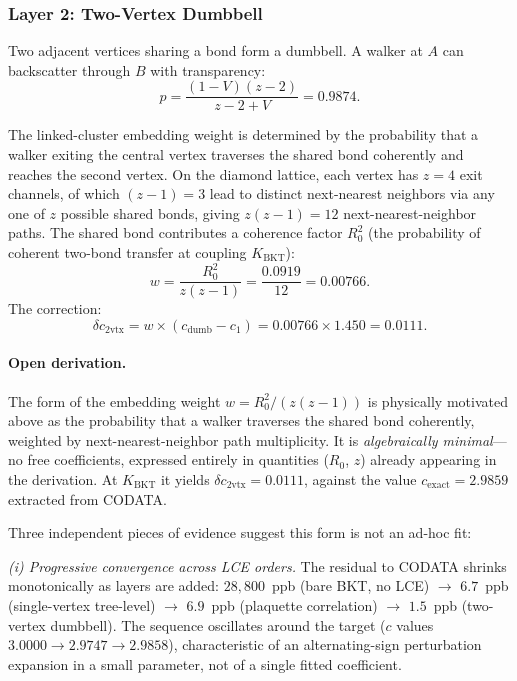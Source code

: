 \documentclass[aps,prd,onecolumn,superscriptaddress,floatfix,12pt]{revtex4-2}
\newcommand{\Rzero}{R_0}
\newcommand{\KBKT}{K_{\text{BKT}}}
\begin{document}
\subsubsection{Layer 2: Two-Vertex Dumbbell}

Two adjacent vertices sharing a bond form a dumbbell. A walker at $A$ can backscatter through $B$ with transparency:
\begin{equation}\label{eq:transparency}
p = \frac{(1-V)(z-2)}{z-2+V} = 0.9874.
\end{equation}

The linked-cluster embedding weight is determined by the probability that a walker exiting the central vertex traverses the shared bond coherently and reaches the second vertex.  On the diamond lattice, each vertex has $z = 4$ exit channels, of which $(z{-}1) = 3$ lead to distinct next-nearest neighbors via any one of $z$ possible shared bonds, giving $z(z{-}1) = 12$ next-nearest-neighbor paths. The shared bond contributes a coherence factor $\Rzero^2$ (the probability of coherent two-bond transfer at coupling $\KBKT$):
\begin{equation}
w = \frac{\Rzero^2}{z(z-1)} = \frac{0.0919}{12} = 0.00766.
\end{equation} The correction:
\begin{equation}
\delta c_{2\text{vtx}} = w \times (c_{\text{dumb}} - c_1) = 0.00766 \times 1.450 = 0.0111.
\end{equation}

\paragraph{Open derivation.}
The form of the embedding weight $w = \Rzero^2/(z(z-1))$ is physically motivated above as the probability that a walker traverses the shared bond coherently, weighted by next-nearest-neighbor path multiplicity. It is \emph{algebraically minimal}---no free coefficients, expressed entirely in quantities ($\Rzero$, $z$) already appearing in the derivation. At $K_{\text{BKT}}$ it yields $\delta c_{2\text{vtx}} = 0.0111$, against the value $c_{\text{exact}} = 2.9859$ extracted from CODATA.

Three independent pieces of evidence suggest this form is not an ad-hoc fit:

\emph{(i) Progressive convergence across LCE orders.} The residual to CODATA shrinks monotonically as layers are added: $28{,}800$~ppb (bare BKT, no LCE) $\to$ $6.7$~ppb (single-vertex tree-level) $\to$ $6.9$~ppb (plaquette correlation) $\to$ $1.5$~ppb (two-vertex dumbbell). The sequence oscillates around the target ($c$ values $3.0000 \to 2.9747 \to 2.9858$), characteristic of an alternating-sign perturbation expansion in a small parameter, not of a single fitted coefficient.
\end{document}
